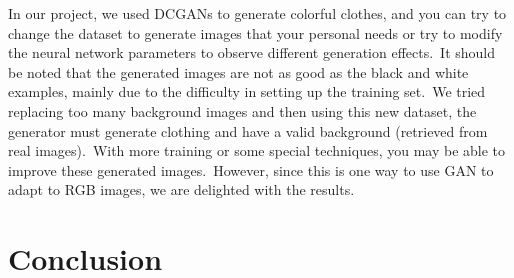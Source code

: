 \documentclass[conference]{IEEEtran}
\begin{document}
    In our project, we used DCGANs to generate colorful clothes, and you can try to change the dataset to generate images that your personal needs or try to modify the neural network parameters to observe different generation effects.\ It should be noted that the generated images are not as good as the black and white examples, mainly due to the difficulty in setting up the training set.\ We tried replacing too many background images and then using this new dataset, the generator must generate clothing and have a valid background (retrieved from real images).\ With more training or some special techniques, you may be able to improve these generated images.\ However, since this is one way to use GAN to adapt to RGB images, we are delighted with the results.

    \section{Conclusion}\label{sec:conclusion}

    
    
\end{document}
